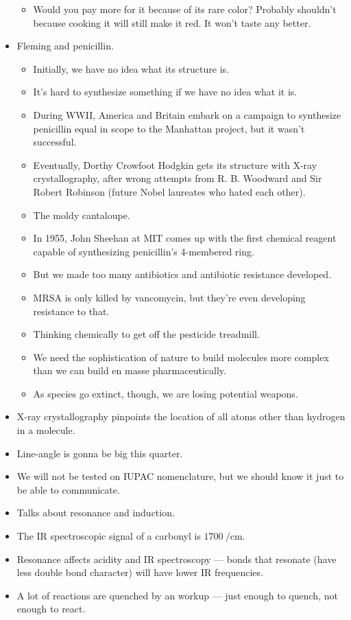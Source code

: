 \documentclass[../notes.tex]{subfiles}
\begin{document}
\begin{itemize}
    \begin{itemize}
        \item Would you pay more for it because of its rare color? Probably shouldn't because cooking it will still make it red. It won't taste any better.
    \end{itemize}
    \item Fleming and penicillin.
    \begin{itemize}
        \item Initially, we have no idea what its structure is.
        \item It's hard to synthesize something if we have no idea what it is.
        \item During WWII, America and Britain embark on a campaign to synthesize penicillin equal in scope to the Manhattan project, but it wasn't successful.
        \item Eventually, Dorthy Crowfoot Hodgkin gets its structure with X-ray crystallography, after wrong attempts from R. B. Woodward and Sir Robert Robinson (future Nobel laureates who hated each other).
        \item The moldy cantaloupe.
        \item In 1955, John Sheehan at MIT comes up with the first chemical reagent capable of synthesizing penicillin's 4-membered ring.
        \item But we made too many antibiotics and antibiotic resistance developed.
        \item MRSA is only killed by vancomycin, but they're even developing resistance to that.
        \item Thinking chemically to get off the pesticide treadmill.
        \item We need the sophistication of nature to build molecules more complex than we can build en masse pharmaceutically.
        \item As species go extinct, though, we are losing potential weapons.
    \end{itemize}
    \item X-ray crystallography pinpoints the location of all atoms other than hydrogen in a molecule.
    \item Line-angle is gonna be big this quarter.
    \item We will not be tested on IUPAC nomenclature, but we should know it just to be able to communicate.
    \item Talks about resonance and induction.
    \item The IR spectroscopic signal of a carbonyl is $\SI{1700}{\per\centi\meter}$.
    \item Resonance affects acidity and IR spectroscopy --- bonds that resonate (have less double bond character) will have lower IR frequencies.
    \item A lot of reactions are quenched by an  workup --- just enough to quench, not enough to react.
\end{itemize}
\end{document}
